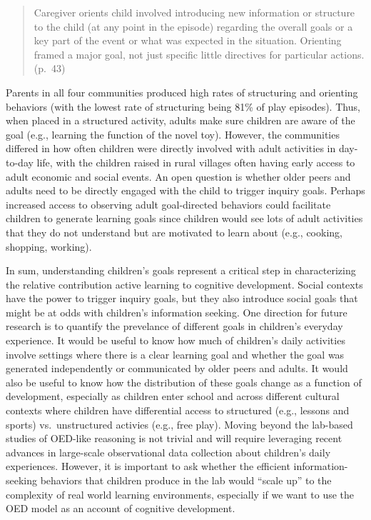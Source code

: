 \documentclass[english,floatsintext,man]{apa6}
\theoremstyle{definition}
\theoremstyle{definition}
\theoremstyle{definition}
\theoremstyle{remark}
\begin{document}
\begin{quote}
Caregiver orients child involved introducing new information or
structure to the child (at any point in the episode) regarding the
overall goals or a key part of the event or what was expected in the
situation. Orienting framed a major goal, not just specific little
directives for particular actions. (p.~43)
\end{quote}

\noindent
Parents in all four communities produced high rates of structuring and
orienting behaviors (with the lowest rate of structuring being 81\% of
play episodes). Thus, when placed in a structured activity, adults make
sure children are aware of the goal (e.g., learning the function of the
novel toy). However, the communities differed in how often children were
directly involved with adult activities in day-to-day life, with the
children raised in rural villages often having early access to adult
economic and social events. An open question is whether older peers and
adults need to be directly engaged with the child to trigger inquiry
goals. Perhaps increased access to observing adult goal-directed
behaviors could facilitate children to generate learning goals since
children would see lots of adult activities that they do not understand
but are motivated to learn about (e.g., cooking, shopping, working).

In sum, understanding children's goals represent a critical step in
characterizing the relative contribution active learning to cognitive
development. Social contexts have the power to trigger inquiry goals,
but they also introduce social goals that might be at odds with
children's information seeking. One direction for future research is to
quantify the prevelance of different goals in children's everyday
experience. It would be useful to know how much of children's daily
activities involve settings where there is a clear learning goal and
whether the goal was generated independently or communicated by older
peers and adults. It would also be useful to know how the distribution
of these goals change as a function of development, especially as
children enter school and across different cultural contexts where
children have differential access to structured (e.g., lessons and
sports) vs.~unstructured activies (e.g., free play). Moving beyond the
lab-based studies of OED-like reasoning is not trivial and will require
leveraging recent advances in large-scale observational data collection
about children's daily experiences. However, it is important to ask
whether the efficient information-seeking behaviors that children
produce in the lab would \enquote{scale up} to the complexity of real
world learning environments, especially if we want to use the OED model
as an account of cognitive development.
\end{document}
